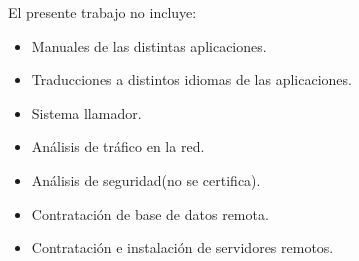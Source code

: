El presente trabajo no incluye:
\begin{itemize}
\item Manuales de las distintas aplicaciones.
\item Traducciones a distintos idiomas de las aplicaciones.
\item Sistema llamador.
\item Análisis de tráfico en la red.
\item Análisis de seguridad(no se certifica).
\item Contratación de base de datos remota.
\item Contratación e instalación de servidores remotos.
\end{itemize}













